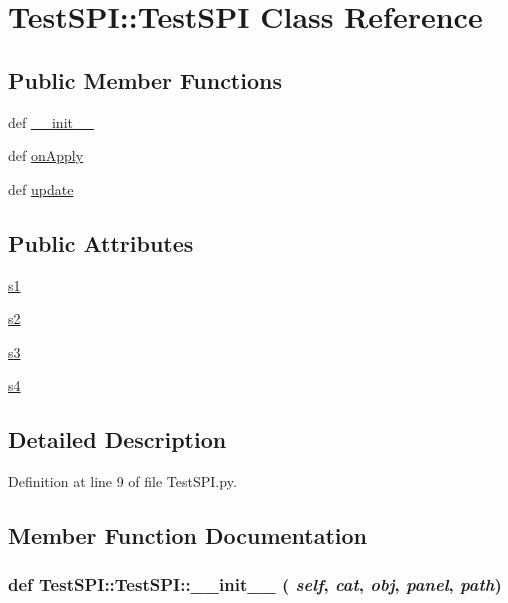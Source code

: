 \hypertarget{classTestSPI_1_1TestSPI}{
\section{TestSPI::TestSPI Class Reference}
\label{classTestSPI_1_1TestSPI}
}
\subsection*{Public Member Functions}
\begin{DoxyCompactItemize}
\item 
def \hyperlink{classTestSPI_1_1TestSPI_a7e9993e8cc1d6ca1dc7eea8e024721b9}{\_\-\_\-init\_\-\_\-}
\item 
def \hyperlink{classTestSPI_1_1TestSPI_ae8f4c2ba34633ffe82da7b6f871ba3dd}{onApply}
\item 
def \hyperlink{classTestSPI_1_1TestSPI_acf61b00c2d0123bc8d7bb2f7a2e4c28f}{update}
\end{DoxyCompactItemize}
\subsection*{Public Attributes}
\begin{DoxyCompactItemize}
\item 
\hyperlink{classTestSPI_1_1TestSPI_ab25da870d08e4310a12aa4f4afc1cd57}{s1}
\item 
\hyperlink{classTestSPI_1_1TestSPI_a0640a3fab135587a250e198b5aac4b26}{s2}
\item 
\hyperlink{classTestSPI_1_1TestSPI_a5d667d30be77efbdc231aa2c33b299cd}{s3}
\item 
\hyperlink{classTestSPI_1_1TestSPI_adb1ecf7362ea0762d556cac4226804d4}{s4}
\end{DoxyCompactItemize}


\subsection{Detailed Description}


Definition at line 9 of file TestSPI.py.

\subsection{Member Function Documentation}
\hypertarget{classTestSPI_1_1TestSPI_a7e9993e8cc1d6ca1dc7eea8e024721b9}{
\subsubsection[{\_\-\_\-init\_\-\_\-}]{\setlength{\rightskip}{0pt plus 5cm}def TestSPI::TestSPI::\_\-\_\-init\_\-\_\- ( {\em self}, \/   {\em cat}, \/   {\em obj}, \/   {\em panel}, \/   {\em path})}}
\label{classTestSPI_1_1TestSPI_a7e9993e8cc1d6ca1dc7eea8e024721b9}


